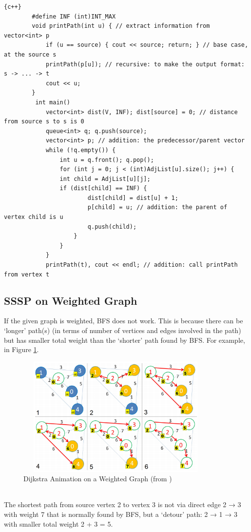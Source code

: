 \begin{lstlisting}{c++}
        #define INF (int)INT_MAX
        void printPath(int u) { // extract information from              vector<int> p
            if (u == source) { cout << source; return; } // base case, at the source s
            printPath(p[u]); // recursive: to make the output format: s -> ... -> t
            cout << u; 
        }
         int main()
            vector<int> dist(V, INF); dist[source] = 0; // distance from source s to s is 0
            queue<int> q; q.push(source);
            vector<int> p; // addition: the predecessor/parent vector
            while (!q.empty()) {
                int u = q.front(); q.pop();
                for (int j = 0; j < (int)AdjList[u].size(); j++) {
                int child = AdjList[u][j];
                if (dist[child] == INF) {
                        dist[child] = dist[u] + 1;
                        p[child] = u; // addition: the parent of vertex child is u
                        q.push(child);
                    }
                }
            }
            printPath(t), cout << endl; // addition: call printPath from vertex t

\end{lstlisting}

\newpage

\subsection{SSSP on Weighted Graph}\label{subsec:SSSP on Weighted Graph}
If the given graph is weighted, BFS does not work. This is because there can be ‘longer’ path(s) (in terms of number of vertices and edges involved in the path) but has smaller total weight than the ‘shorter’ path found by BFS. For example, in Figure \ref{fig:dijkstra-animation}.

\begin{figure}[h]
    \centering
\includegraphics[width=10cm, height=6cm]{dijkstra-animation.png}
 \caption{Dijkstra Animation on a Weighted Graph (from \href{https://vj.z180.cn/52627383937f06635b950dd1efa17b6a?v=1575637256}{\color{red}{UVa 341}})}
    \label{fig:dijkstra-animation}
\end{figure}
\\
\hspace{7mm}The shortest path from source vertex 2 to vertex 3 is not via direct edge 2 → 3 with weight 7 that is normally found by BFS, but a ‘detour’ path: 2 → 1 → 3 with smaller total weight 2 + 3 = 5.

